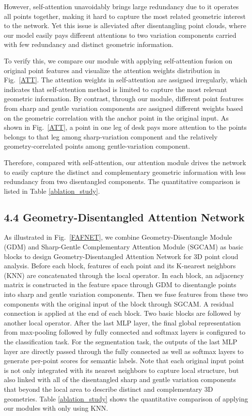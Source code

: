 \documentclass[letterpaper]{article} \usepackage{aaai21}  \usepackage{times}  \usepackage{helvet} \usepackage{courier}  \usepackage[hyphens]{url}  \usepackage{graphicx} \urlstyle{rm} \def\UrlFont{\rm}  \usepackage{natbib}  \usepackage{caption} \frenchspacing  \setlength{\pdfpagewidth}{8.5in}  \setlength{\pdfpageheight}{11in}  \usepackage{color}
\begin{document}
However, self-attention unavoidably brings large redundancy due to it operates all points together, making it hard to capture the most related geometric interest to the network. Yet this issue is alleviated after disentangling point clouds, where our model easily pays different attentions to two variation components carried with few redundancy and distinct geometric information. 

To verify this, we compare our module with applying self-attention fusion on original point features and visualize the attention weights distribution in Fig.~\ref{ATT}. The attention weights in self-attention are assigned irregularly, which indicates that self-attention method is limited to capture the most relevant geometric information. By contrast, through our module, different point features from sharp and gentle variation components are assigned different weights based on the geometric correlation with the anchor point in the original input. As shown in Fig.~\ref{ATT}, a point in one leg of desk pays more attention to the points belongs to that leg among sharp-variation component and the relatively geometry-correlated points among gentle-variation component. 

Therefore, compared with self-attention, our attention module drives the network to easily capture the distinct and complementary geometric information with less redundancy from two disentangled components. The quantitative comparison is listed in Table \ref{ablation_study}.

\subsection{4.4 Geometry-Disentangled Attention Network}
As illustrated in Fig.~\ref{FAFNET}, we combine Geometry-Disentangle Module (GDM) and Sharp-Gentle Complementary Attention Module (SGCAM) as basic blocks to design Geometry-Disentangled  Attention Network for 3D point cloud analysis. Before each block, features of each point and its K-nearest neighbors (KNN) are concatenated through the local operator. In each block, an adjacency matrix is constructed in the feature space through GDM to disentangle points into sharp and gentle variation components. Then we fuse features from these two components with the original input of the block through SGCAM. A residual connection \cite{He_2016_CVPR} is applied at the end of each block. Two basic blocks are followed by another local operator. After the last MLP layer, the final global representation from max-pooling followed by fully connected and softmax layers is configured to the classification task. For the segmentation task, the outputs of the last MLP layer are directly passed through the fully connected as well as softmax layers to generate per-point scores for semantic labels. Note that each original input point is not only integrated with its nearest neighbors to capture local structure, but also linked with all of the disentangled sharp and gentle variation components that beyond the local area to describe distinct and complementary 3D geometries. Table \ref{ablation_study} shows the quantitative comparison of applying our modules with only using KNN.
\end{document}
